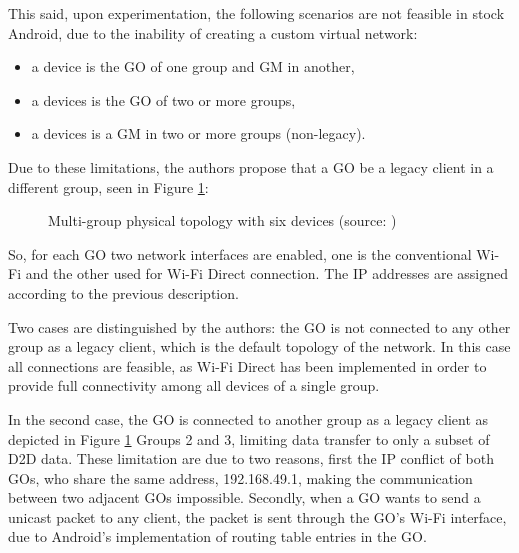 This said, upon experimentation, the following scenarios are not feasible in stock Android, due to the inability of creating a custom virtual network:

\begin{itemize}
\item a device is the \gls{GO} of one group and \gls{GM} in another,
\item a devices is the \gls{GO} of two or more groups,
\item a devices is a \gls{GM} in two or more groups (non-legacy).
\end{itemize}

Due to these limitations, the authors propose that a \gls{GO} be a legacy client in a different group, seen in Figure \ref{fig:mgrouprouting}:

\begin{figure}[ht]
	\noindent{}
	\caption{\label{fig:mgrouprouting} Multi-group physical topology with six devices (source: \cite{routeMultiGroup})}
\end{figure}

So, for each \gls{GO} two network interfaces are enabled, one is the conventional Wi-Fi and the other used for Wi-Fi Direct connection. The \gls{IP} addresses are assigned according to the previous description.

Two cases are distinguished by the authors: the \gls{GO} is not connected to any other group as a legacy client, which is the default topology of the network. In this case all connections are feasible, as Wi-Fi Direct has been implemented in order to provide full connectivity among all devices of a single group.

In the second case, the \gls{GO} is connected to another group as a legacy client as depicted in Figure \ref{fig:mgrouprouting} Groups 2 and 3, limiting data transfer to only a subset of D2D data. These limitation are due to two reasons, first the \gls{IP} conflict of both \glspl{GO}, who share the same address, 192.168.49.1, making the communication between two adjacent \glspl{GO} impossible. Secondly, when a \gls{GO} wants to send a unicast packet to any client, the packet is sent through the \gls{GO}'s Wi-Fi interface, due to Android's implementation of routing table entries in the \gls{GO}.

